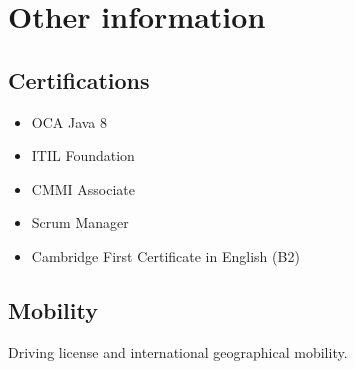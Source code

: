 \documentclass[letterpaper]{twentysecondcv} %
\begin{document}

\section{Other information}
\subsection{Certifications}
\begin{itemize}
\item OCA Java 8
\item ITIL Foundation
\item CMMI Associate
\item Scrum Manager
\item Cambridge First Certificate in English (B2)
\end{itemize}
\subsection{Mobility}
Driving license and international geographical mobility.






\end{document}
